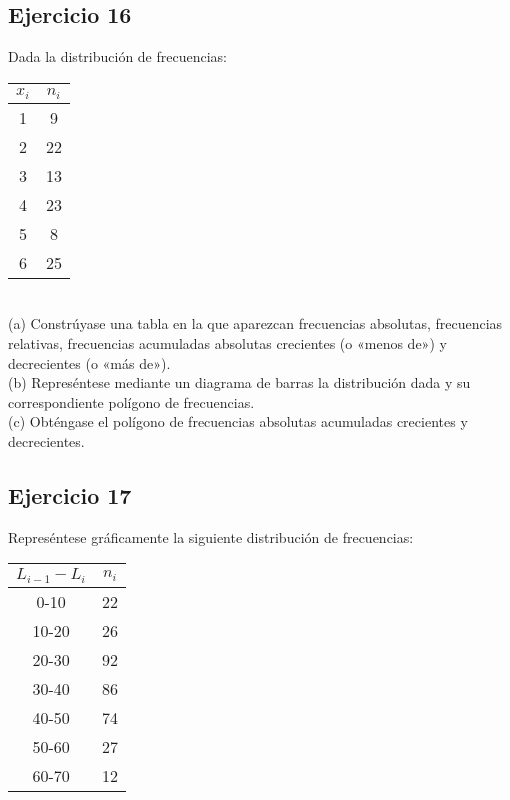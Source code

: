 \documentclass[11pt,letterpaper]{report}
\begin{document}
      \subsection*{Ejercicio 16}
         Dada la distribución de frecuencias:
         \begin{table}[!h]
             \centering
             \begin{tabular}{|c|c|}
                 \hline
                 $x_i$ & $n_i$ \\
                 \hline
                 1  & 9   \\
                 \hline
                 2  & 22  \\
                 \hline
                 3  & 13  \\
                 \hline
                 4  & 23  \\
                 \hline
                 5  & 8   \\
                 \hline
                 6  & 25  \\
                 \hline
             \end{tabular}
         \end{table}
         \\
         (a) Constrúyase una tabla en la que aparezcan frecuencias absolutas, frecuencias relativas, frecuencias acumuladas absolutas crecientes (o «menos de») y decrecientes (o «más de»).\\
         (b) Represéntese mediante un diagrama de barras la distribución dada y su correspondiente polígono de frecuencias.\\
         (c) Obténgase el polígono de frecuencias absolutas acumuladas crecientes y decrecientes.\\
      \subsection*{Ejercicio 17}
        Represéntese gráficamente la siguiente distribución de frecuencias:
        \begin{table}[!h]
            \centering
            \begin{tabular}{|c|c|}
                \hline
                $L_{i-1}-L_i$  & $n_i$\\
                \hline
                0-10& 22\\
                \hline
                10-20& 26\\
                \hline
                20-30& 92\\
                \hline
                30-40& 86\\
                \hline
                40-50& 74\\
                \hline
                50-60& 27\\
                \hline
                60-70& 12\\
                \hline
            \end{tabular}
        \end{table}
\end{document}
